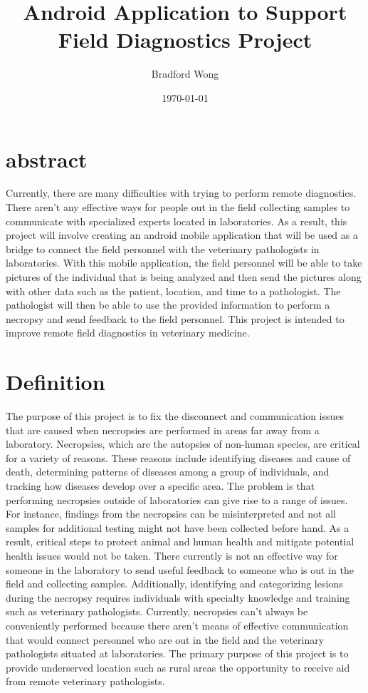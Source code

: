 \documentclass[journal,10pt,onecolumn,draftclsnofoot,]{IEEEtran}
\title{Android Application to Support Field Diagnostics Project}
\author{Bradford Wong}
\date{\today}
\begin{document}
\maketitle


\section{abstract}
\label{sec:abstract}
Currently, there are many difficulties with trying to perform remote diagnostics. There aren’t any effective ways for people out in the field collecting samples to communicate with specialized experts located in laboratories. As a result, this project will involve creating an android mobile application that will be used as a bridge to connect the field personnel with the veterinary pathologists in laboratories. With this mobile application, the field personnel will be able to take pictures of the individual that is being analyzed and then send the pictures along with other data such as the patient, location, and time to a pathologist. The pathologist will then be able to use the provided information to perform a necropsy and send feedback to the field personnel. This project is intended to improve remote field diagnostics in veterinary medicine.


\section{Definition}
\label{sec:introduction}

The purpose of this project is to fix the disconnect and communication issues that are caused when necropsies are performed in areas far away from a laboratory. Necropsies, which are the autopsies of non-human species, are critical for a variety of reasons. These reasons include identifying diseases and cause of death, determining patterns of diseases among a group of individuals, and tracking how diseases develop over a specific area. The problem is that performing necropsies outside of laboratories can give rise to a range of issues. For instance, findings from the necropsies can be misinterpreted and not all samples for additional testing might not have been collected before hand. As a result, critical steps to protect animal and human health and mitigate potential health issues would not be taken. There currently is not an effective way for someone in the laboratory to send useful feedback to someone who is out in the field and collecting samples. Additionally, identifying and categorizing lesions during the necropsy requires individuals with specialty knowledge and training such as veterinary pathologists. Currently, necropsies can’t always be conveniently performed because there aren’t means of effective communication that would connect personnel who are out in the field and the veterinary pathologists situated at laboratories. The primary purpose of this project is to provide underserved location such as rural areas the opportunity to receive aid from remote veterinary pathologists.
\end{document}
